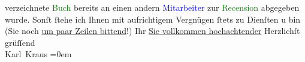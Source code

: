                         \label{K_L00191_1v}\label{K_L00191_1h} verzeichnete \textcolor{green}{Buch}{} bereits an einen andern
                        \textcolor{blue}{Mitarbeiter}{} zur \textcolor{green}{Recension}{} abgegeben
                    wurde.\pend
           \pstart
           Sonſt ſtehe ich Ihnen mit aufrichtigem Vergnügen ſtets zu Dienſten u bin (Sie
                    noch \uline{um paar Zeilen bittend}!) Ihr \uline{Sie vollkommen hochachtender}\pend
           \pstart
           Herzlichſt grüſſend{\\[\baselineskip]}\spacefill\mbox{Karl Kraus}\pend
           \leftskip=0em{}\endnumbering{}  
      